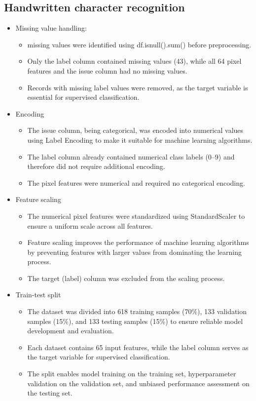 \documentclass[12pt,a4paper]{article}
\begin{document}
\subsection*{ Handwritten character recognition}
\begin{itemize}
\item Missing value handling:
\begin{itemize}
\item missing values were identified using df.isnull().sum() before preprocessing.
\item Only the label column contained missing values (43), while all 64 pixel features and the issue column had no missing values.
\item Records with missing label values were removed, as the target variable is essential for supervised classification.
\end{itemize}
\item Encoding
\begin{itemize}
\item The issue column, being categorical, was encoded into numerical values using Label Encoding to make it suitable for machine learning algorithms.
\item The label column already contained numerical class labels (0–9) and therefore did not require additional encoding.
\item The pixel features were numerical and required no categorical encoding.
\end{itemize}
\item Feature scaling
\begin{itemize}
\item The numerical pixel features were standardized using StandardScaler to ensure a uniform scale across all features.
\item Feature scaling improves the performance of machine learning algorithms by preventing features with larger values from dominating the learning process.
\item The target (label) column was excluded from the scaling process.
\end{itemize}
\item Train-test split
\begin{itemize}
\item The dataset was divided into 618 training samples (70\%), 133 validation samples (15\%), and 133 testing samples (15\%) to ensure reliable model development and evaluation.
\item Each dataset contains 65 input features, while the label column serves as the target variable for supervised classification.
\item The split enables model training on the training set, hyperparameter validation on the validation set, and unbiased performance assessment on the testing set.
\end{itemize}
\end{itemize}
\end{document}
